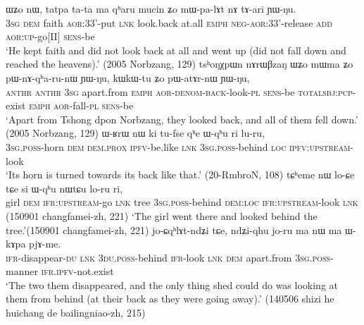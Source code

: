 \begin{exe}
\ex \label{ex:qharu2}
\begin{xlist}[(ii)]
 \label{ex:qharu.mWpalAt}
\gll  ɯʑo nɯ, tatpa ta-ta ma qʰaru mucin ʑo mɯ-pa-lɤt nɤ tɤ-ari ɲɯ-ŋu. \\
\textsc{3sg} \textsc{dem} faith \textsc{aor}:3\fl{}3'-put \textsc{lnk} look.back at.all \textsc{emph} \textsc{neg}-\textsc{aor}:3\fl{}3'-release \textsc{add} \textsc{aor}:\textsc{up}-go[II] \textsc{sens}-be \\
\glt `He kept faith and did not look back at all and went up (did not fall down and reached the heavens).' (2005 Norbzang, 129)
\gll  tsʰoŋχpɯn nɤrɯβzaŋ ɯʑo mɯma ʑo pɯ-nɤ-qʰa-ru-nɯ ɲɯ-ŋu, kɯ\redp{}kɯ-tu ʑo pɯ-atɤr-nɯ ɲɯ-ŋu, \\
\textsc{anthr}  \textsc{anthr} \textsc{3sg} apart.from \textsc{emph} \textsc{aor}-\textsc{denom}-\textsc{back}-look-\textsc{pl} \textsc{sens}-be \textsc{total}\redp{}\textsc{sbj}:\textsc{pcp}-exist \textsc{emph} \textsc{aor}-fall-\textsc{pl} \textsc{sens}-be \\
\glt `Apart from Tshong dpon Norbzang, they looked back, and all of them fell down.' (2005 Norbzang, 129)
 \label{ex:Wqhu.luru}
\gll ɯ-ʁrɯ nɯ ki tu-fse qʰe  ɯ-qʰu ri lu-ru,  \\
\textsc{3sg}.\textsc{poss}-horn \textsc{dem} \textsc{dem}.\textsc{prox} \textsc{ipfv}-be.like \textsc{lnk} \textsc{3sg}.\textsc{poss}-behind \textsc{loc} \textsc{ipfv}:\textsc{upstream}-look \\
\glt `Its horn is turned towards its back like that.' (20-RmbroN, 108)
 \label{ex:si.Wqhu.loru}
\gll tɕʰeme nɯ lo-ɕe tɕe si ɯ-qʰu nɯtɕu lo-ru ri, \\
girl \textsc{dem} \textsc{ifr}:\textsc{upstream}-go \textsc{lnk} tree \textsc{3sg}.\textsc{poss}-behind \textsc{dem}:\textsc{loc} \textsc{ifr}:\textsc{upstream}-look \textsc{lnk} \\
\glt (150901 changfamei-zh, 221)
\glt `The girl went there and looked behind the tree.'(150901 changfamei-zh, 221)
 \label{ex:ndZiqhu.koru}
\gll jo-ɕqʰlɤt-ndʑi tɕe, ndʑi-qhu jo-ru ma nɯ ma ɯ-kɤpa pjɤ-me. \\
\textsc{ifr}-disappear-\textsc{du} \textsc{lnk} \textsc{3du}.\textsc{poss}-behind \textsc{ifr}-look \textsc{lnk} \textsc{dem} apart.from \textsc{3sg}.\textsc{poss}-manner \textsc{ifr}.\textsc{ipfv}-not.exist \\
\glt `The two them disappeared, and the only thing shed could do was looking at them from behind  (at their back as they were going away).' (140506 shizi he huichang de bailingniao-zh, 215)
\end{xlist}
\end{exe}

